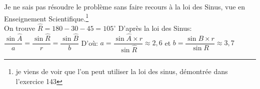 \documentclass[12pt, a4paper]{article}
\begin{document}
\begin{Exercise}[number={146}]
    \begin{minipage}{\dimexpr\textwidth-10px-\parindent\relax}
    \medbreak Je ne sais pas résoudre le problème sans faire recours à la loi des Sinus, vue en Enseignement Scientifique.\footnote{je viens de voir que l'on peut utiliser la loi des sinus, démontrée dans l'exercice 143} \\
    On trouve $\widehat{R}=180-30-45=105^{\circ}$ \bigbreak
    D'après la loi des Sinus: \qquad $\dfrac{\sin{\widehat{A}}}{a}=\dfrac{\sin{\widehat{R}}}{r}=\dfrac{\sin{\widehat{B}}}{b}$ \medbreak
    D'où: \quad $a=\dfrac{\sin{\widehat{A}\times r}}{\sin{\widehat{R}}}\approx 2{,}6$ \quad et \quad $b=\dfrac{\sin{B}\times r}{\sin{R}}\approx 3{,}7$
    \end{minipage}
\end{Exercise}
\end{document}
